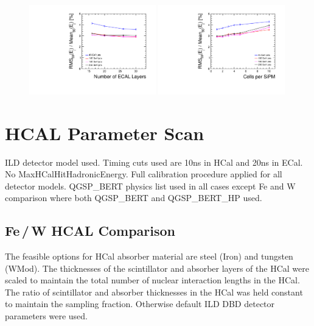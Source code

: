 \documentclass[final,3p,times,twocolumn]{elsarticle}
\begin{document}
\begin{figure}[!h]
  \begin{center}
     \includegraphics[width=0.49\textwidth]{Res_vs_L_diffE_Photon.pdf}
     \includegraphics[width=0.49\textwidth]{Res_vs_M_diffE_Photon.pdf}
     \caption{\label{}}
  \end{center}
\end{figure}


\section{HCAL Parameter Scan}
ILD detector model used.  Timing cuts used are 10ns in HCal and 20ns in ECal.  No MaxHCalHitHadronicEnergy.  Full calibration procedure applied for all detector models.  
QGSP\_BERT physics list used in all cases except Fe and W comparison where both QGSP\_BERT and QGSP\_BERT\_HP used. 

\subsection{Fe\,/\,W HCAL Comparison}
The feasible options for HCal absorber material are steel (Iron) and tungsten (WMod).  The thicknesses of the scintillator and absorber layers of the HCal were scaled to maintain the total number of nuclear interaction lengths in the HCal.  The ratio of scintillator and absorber thicknesses in the HCal was held constant to maintain the sampling fraction.  Otherwise default ILD DBD detector parameters were used.
\end{document}
